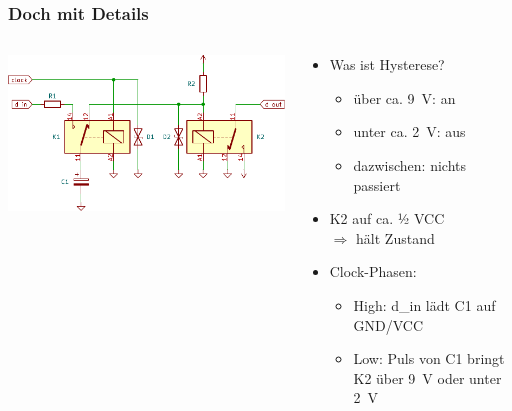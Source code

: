 \documentclass[t,aspectratio=169,usenames,dvipsnames]{beamer}
\begin{document}
\begin{frame}[c]
  \frametitle{Doch mit Details}

  \begin{columns}[c]
    \begin{column}{.45\textwidth}
      \includegraphics[width=\textwidth]{register-relay.pdf}
    \end{column}
    \begin{column}{.45\textwidth}
      \begin{itemize}
      \item Was ist Hysterese?
        \begin{itemize}
        \item über ca. 9~V: an
        \item unter ca. 2~V: aus
        \item dazwischen: nichts passiert
        \end{itemize}

      \item K2 auf ca. ½ VCC \\
        $\Rightarrow$ hält Zustand

        \bigskip

      \item Clock-Phasen:
        \begin{itemize}
        \item High: d\_in lädt C1 auf GND/VCC
        \item Low: Puls von C1 bringt K2 über 9~V oder unter 2~V
        \end{itemize}
      \end{itemize}
    \end{column}
  \end{columns}

\end{frame}
\end{document}
